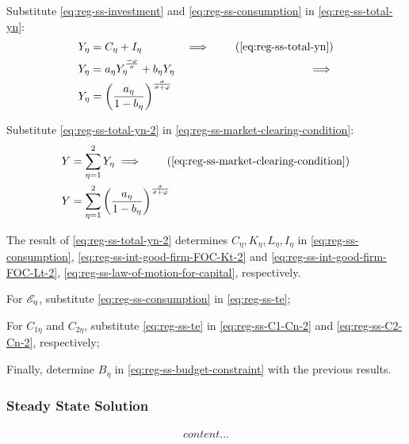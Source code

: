 \documentclass[
thesis.tex
]{subfiles}
\begin{document}
	Substitute \ref{eq:reg-ss-investment} and \ref{eq:reg-ss-consumption} in \ref{eq:reg-ss-total-yn}:
	\begin{alignat}{2}
		Y_{\eta} &= C_{\eta} + I_{\eta} &\implies \tag{\ref{eq:reg-ss-total-yn}} \\
		Y_{\eta} &= a_{\eta} Y_{\eta}^{\frac{-\varphi}{\sigma}} + b_{\eta} Y_{\eta} &\implies \nonumber \\
		Y_{\eta} &= \left( \frac{a_{\eta}}{1 -b_{\eta}} \right) ^{\frac{\sigma}{\sigma + \varphi}} \label{eq:reg-ss-total-yn-2}
	\end{alignat}

Substitute \ref{eq:reg-ss-total-yn-2} in \ref{eq:reg-ss-market-clearing-condition}:
	\begin{align}
		Y &= \sum_{\eta=1}^{2} Y_{\eta} \implies \tag{\ref{eq:reg-ss-market-clearing-condition}} \\
		Y &= \sum_{\eta=1}^{2} \left( \frac{a_{\eta}}{1 -b_{\eta}} \right) ^{\frac{\sigma}{\sigma + \varphi}} \label{eq:reg-ss-market-clearing-condition-2}
	\end{align}

	The result of \ref{eq:reg-ss-total-yn-2} determines $C_{\eta}, K_{\eta}, L_{\eta}, I_{\eta}$ in \ref{eq:reg-ss-consumption}, \ref{eq:reg-ss-int-good-firm-FOC-Kt-2} and \ref{eq:reg-ss-int-good-firm-FOC-Lt-2}, \ref{eq:reg-ss-law-of-motion-for-capital}, respectively.
	
	For $\te[]$, substitute \ref{eq:reg-ss-consumption} in \ref{eq:reg-ss-te};
	
	For $C_{1\eta}$ and $C_{2\eta}$, substitute \ref{eq:reg-ss-te} in \ref{eq:reg-ss-C1-Cn-2} and \ref{eq:reg-ss-C2-Cn-2}, respectively;

	Finally, determine $B_{\eta}$ in \ref{eq:reg-ss-budget-constraint} with the previous results.

	
	\subsubsection*{Steady State Solution}
	
	\vspace*{-1cm}

	\begin{align}
		content...
	\end{align}
\end{document}
